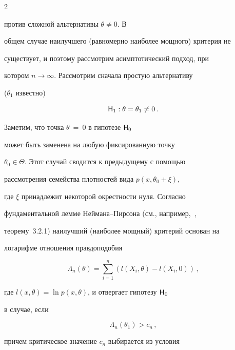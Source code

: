 \begin{multicols}{2}
\begin{equation}
\end{equation}


против сложной альтернативы $\theta\ne 0$. В


общем случае наилучшего (равномерно наиболее мощного) критерия не


существует, и поэтому рассмотрим асимптотический подход, при


котором $n\to\infty$. Рассмотрим сначала простую альтернативу


($\theta_1$ известно)


\begin{equation}


{\sf H}_1:\theta = \theta_1\ne0\,.


\label{6.2b}


\end{equation}


Заметим, что точка $\theta\:=\:0$ в гипотезе ${\sf H}_0$


может быть заменена на любую фиксированную точку


$\theta_0\in\Theta$. Этот случай сводится к предыдущему с помощью


рассмотрения семейства плотностей вида $p(x,\theta_0+\xi)$,


где $\xi$ принадлежит некоторой окрестности нуля. Согласно


фундаментальной лемме Неймана--Пирсона (см., например,~\cite{46be},


теорему~3.2.1) наилучший (наиболее мощный) критерий основан на


логарифме отношения правдоподобия


\begin{equation}


\Lambda_n(\theta) =


\sum_{i=1}^{n}(l(X_i,\theta)-l(X_i,0))\,,


\label{6.3b}


\end{equation}


где $l(x,\theta) = \ln p(x,\theta)$, и отвергает гипотезу ${\sf H}_0$


в случае, если


$$


\Lambda_n(\theta_1) > c_n\,,


$$


причем критическое значение $c_n$ выбирается из условия


\begin{equation}



\end{equation}
\end{multicols}
